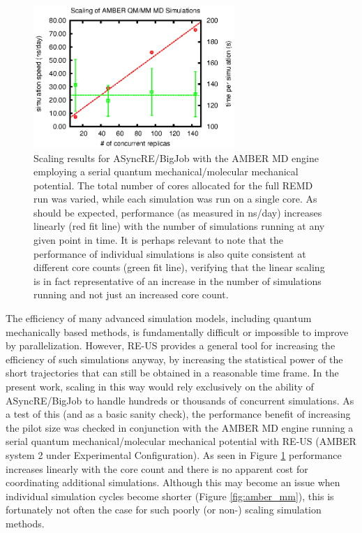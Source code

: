 \begin{figure}
\includegraphics[width=3in]{amber_data/qmmm.eps}
\caption{
  Scaling results for ASyncRE/BigJob with the AMBER MD engine employing a
  serial quantum mechanical/molecular mechanical potential. The total number
  of cores allocated for the full REMD run was varied, while each simulation
  was run on a single core. As should be expected, performance (as measured in
  ns/day) increases linearly (red fit line) with the number of simulations 
  running at any given point in time. It is perhaps relevant to note that the
  performance of individual simulations is also quite consistent at different
  core counts (green fit line), verifying that the linear scaling is in fact
  representative of an increase in the number of simulations running and not
  just an increased core count.
  \label{fig:amber_qmmm}  
}
\end{figure}

The efficiency of many advanced simulation models, including quantum 
mechanically based methods, is fundamentally difficult or impossible to improve 
by parallelization. However, RE-US provides a general tool for increasing the
efficiency of such simulations anyway, by increasing the statistical power of
the short trajectories that can still be obtained in a reasonable time frame.
In the present work, scaling in this way would rely exclusively on the ability 
of ASyncRE/BigJob to handle hundreds or thousands of concurrent simulations.
As a test of this (and as a basic sanity check), the performance benefit of 
increasing the pilot size was checked in conjunction with the AMBER MD engine
running a serial quantum mechanical/molecular mechanical potential with RE-US
(AMBER system 2 under Experimental Configuration). As seen in Figure 
\ref{fig:amber_qmmm} performance increases linearly with the core count and
there is no apparent cost for coordinating additional simulations. Although 
this may become an issue when individual simulation cycles become shorter
(Figure \ref{fig:amber_mm}), this is fortunately not often the case for such 
poorly (or non-) scaling simulation methods.
